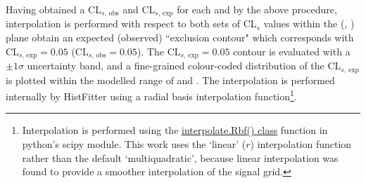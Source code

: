 Having obtained a CL\(_{s\text{, obs}}\) and CL\(_{s\text{, exp}}\) for each \ms and \mZp by the above procedure, interpolation is performed with respect to both sets of CL\(_s\) values within the (\ms, \mZp) plane obtain an expected (observed) ``exclusion contour" which corresponds with CL\(_{s\text{, exp}}=0.05\) (CL\(_{s\text{, obs}}=0.05\)). The CL\(_{s\text{, exp}}=0.05\) contour is evaluated with a \(\pm1\sigma\) uncertainty band, and a fine-grained colour-coded distribution of the CL\(_{s\text{, exp}}\) is plotted within the modelled range of \ms and \mZp. The interpolation is performed internally by HistFitter using a radial basis interpolation function\footnote{Interpolation is performed using the \href{https://docs.scipy.org/doc/scipy/reference/generated/scipy.interpolate.Rbf.html}{interpolate.Rbf() class} function in python's scipy module. This work uses the `linear' (\(r\)) interpolation function rather than the default `multiquadratic', because linear interpolation was found to provide a smoother interpolation of the signal grid.}. 


